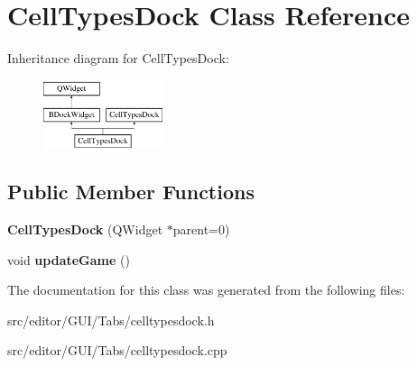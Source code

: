 \hypertarget{class_cell_types_dock}{\section{\-Cell\-Types\-Dock \-Class \-Reference}
\label{class_cell_types_dock}
}
\-Inheritance diagram for \-Cell\-Types\-Dock\-:\begin{figure}[H]
\begin{center}
\leavevmode
\includegraphics[height=2.000000cm]{class_cell_types_dock}
\end{center}
\end{figure}
\subsection*{\-Public \-Member \-Functions}
\begin{DoxyCompactItemize}
\item 
\hypertarget{class_cell_types_dock_a0e1bc992465cea9c1fc71866b425fcbb}{{\bfseries \-Cell\-Types\-Dock} (\-Q\-Widget $\ast$parent=0)}\label{class_cell_types_dock_a0e1bc992465cea9c1fc71866b425fcbb}

\item 
\hypertarget{class_cell_types_dock_a700565cc4bb4c3e87d219d4d4726e680}{void {\bfseries update\-Game} ()}\label{class_cell_types_dock_a700565cc4bb4c3e87d219d4d4726e680}

\end{DoxyCompactItemize}


\-The documentation for this class was generated from the following files\-:\begin{DoxyCompactItemize}
\item 
src/editor/\-G\-U\-I/\-Tabs/celltypesdock.\-h\item 
src/editor/\-G\-U\-I/\-Tabs/celltypesdock.\-cpp\end{DoxyCompactItemize}
